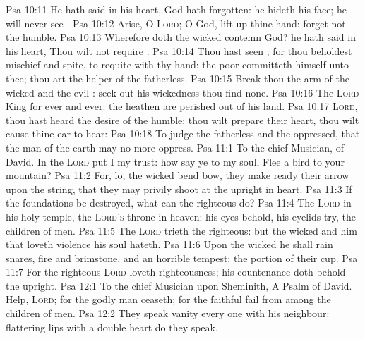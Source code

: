 \vs Psa 10:11 He hath said in his heart, God hath forgotten: he hideth his face; he will never see .
\vs Psa 10:12 Arise, O \textsc{Lord}; O God, lift up thine hand: forget not the humble.
\vs Psa 10:13 Wherefore doth the wicked contemn God? he hath said in his heart, Thou wilt not require .
\vs Psa 10:14 Thou hast seen ; for thou beholdest mischief and spite, to requite  with thy hand: the poor committeth himself unto thee; thou art the helper of the fatherless.
\vs Psa 10:15 Break thou the arm of the wicked and the evil : seek out his wickedness  thou find none.
\vs Psa 10:16 The \textsc{Lord}  King for ever and ever: the heathen are perished out of his land.
\vs Psa 10:17 \textsc{Lord}, thou hast heard the desire of the humble: thou wilt prepare their heart, thou wilt cause thine ear to hear:
\vs Psa 10:18 To judge the fatherless and the oppressed, that the man of the earth may no more oppress.
\vs Psa 11:1 To the chief Musician,  of David. In the \textsc{Lord} put I my trust: how say ye to my soul, Flee  a bird to your mountain?
\vs Psa 11:2 For, lo, the wicked bend  bow, they make ready their arrow upon the string, that they may privily shoot at the upright in heart.
\vs Psa 11:3 If the foundations be destroyed, what can the righteous do?
\vs Psa 11:4 The \textsc{Lord}  in his holy temple, the \textsc{Lord's} throne  in heaven: his eyes behold, his eyelids try, the children of men.
\vs Psa 11:5 The \textsc{Lord} trieth the righteous: but the wicked and him that loveth violence his soul hateth.
\vs Psa 11:6 Upon the wicked he shall rain snares, fire and brimstone, and an horrible tempest:  the portion of their cup.
\vs Psa 11:7 For the righteous \textsc{Lord} loveth righteousness; his countenance doth behold the upright.
\vs Psa 12:1 To the chief Musician upon Sheminith, A Psalm of David. Help, \textsc{Lord}; for the godly man ceaseth; for the faithful fail from among the children of men.
\vs Psa 12:2 They speak vanity every one with his neighbour:  flattering lips  with a double heart do they speak.
